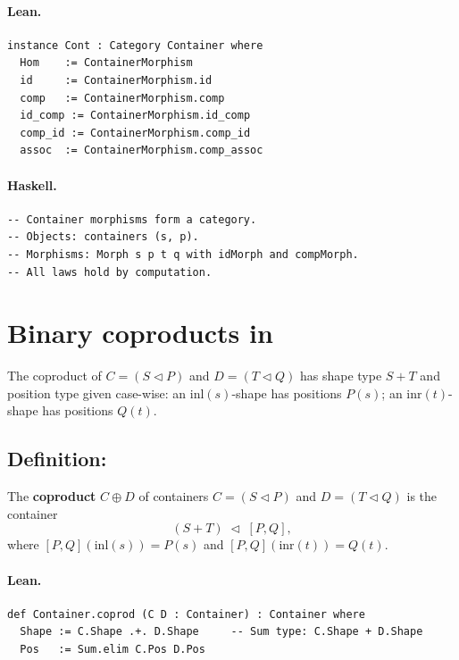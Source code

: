 \documentclass[11pt,a4paper]{article}
\begin{document}
\paragraph{Lean.}
\begin{lstlisting}[style=lean]
instance Cont : Category Container where
  Hom    := ContainerMorphism
  id     := ContainerMorphism.id
  comp   := ContainerMorphism.comp
  id_comp := ContainerMorphism.id_comp
  comp_id := ContainerMorphism.comp_id
  assoc  := ContainerMorphism.comp_assoc
\end{lstlisting}

\paragraph{Haskell.}
\begin{lstlisting}[style=haskell]
-- Container morphisms form a category.
-- Objects: containers (s, p).
-- Morphisms: Morph s p t q with idMorph and compMorph.
-- All laws hold by computation.
\end{lstlisting}


\section{Binary coproducts in }

The coproduct of $C = (S \triangleleft P)$ and $D = (T \triangleleft Q)$ has shape
type $S + T$ and position type given case-wise: an $\mathrm{inl}(s)$-shape has
positions $P(s)$; an $\mathrm{inr}(t)$-shape has positions $Q(t)$.

\subsection{Definition: }

\begin{defn}
The \textbf{coproduct} $C \oplus D$ of containers $C = (S \triangleleft P)$ and
$D = (T \triangleleft Q)$ is the container
\[
  (S + T) \;\triangleleft\; [P, Q],
\]
where $[P, Q](\mathrm{inl}(s)) = P(s)$ and $[P, Q](\mathrm{inr}(t)) = Q(t)$.
\end{defn}

\paragraph{Lean.}
\begin{lstlisting}[style=lean]
def Container.coprod (C D : Container) : Container where
  Shape := C.Shape .+. D.Shape     -- Sum type: C.Shape + D.Shape
  Pos   := Sum.elim C.Pos D.Pos
\end{lstlisting}
\end{document}

